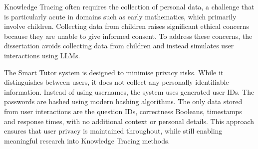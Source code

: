Knowledge Tracing often requires the collection of personal data, a challenge that is particularly acute in domains such as early mathematics, which primarily involve children. Collecting data from children raises significant ethical concerns because they are unable to give informed consent. To address these concerns, the dissertation avoids collecting data from children and instead simulates user interactions using LLMs.

The Smart Tutor system is designed to minimise privacy risks. While it distinguishes between users, it does not collect any personally identifiable information. Instead of using usernames, the system uses generated user IDs. The  passwords are hashed using modern hashing algorithms. The only data stored from user interactions are the question IDs, correctness Booleans, timestamps and response times, with no additional context or personal details. This approach ensures that user privacy is maintained throughout, while still enabling meaningful research into Knowledge Tracing methods.
